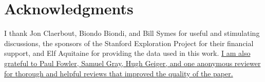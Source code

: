 \section{Acknowledgments}

I thank Jon Claerbout, Biondo Biondi, and Bill Symes for useful and
stimulating discussions, the sponsors of the Stanford Exploration Project for
their financial support, and Elf Aquitaine for providing the data used in this
work. \uline{I am also grateful to Paul Fowler, Samuel Gray, Hugh Geiger, and one
anonymous reviewer for thorough and helpful reviews that improved the quality
of the paper.}

\newpage



